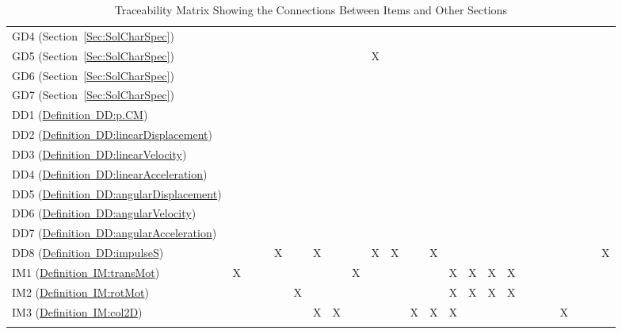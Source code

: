 \documentclass[12pt]{article}
\begin{document}
\begin{longtable}{l l l l l l l l l l l l l l l l l l l l l l l l}
\\
GD4 (Section~\ref{Sec:SolCharSpec}) &  &  &  &  &  &  &  &  &  &  &  &  &  &  &  &  &  &  &  &  &  &  & 
\\
GD5 (Section~\ref{Sec:SolCharSpec}) &  &  &  &  &  &  &  &  & X &  &  &  &  &  &  &  &  &  &  &  &  &  & 
\\
GD6 (Section~\ref{Sec:SolCharSpec}) &  &  &  &  &  &  &  &  &  &  &  &  &  &  &  &  &  &  &  &  &  &  & 
\\
GD7 (Section~\ref{Sec:SolCharSpec}) &  &  &  &  &  &  &  &  &  &  &  &  &  &  &  &  &  &  &  &  &  &  & 
\\
DD1 (\hyperref[DD:p.CM]{Definition~DD:p.CM}) &  &  &  &  &  &  &  &  &  &  &  &  &  &  &  &  &  &  &  &  &  &  & 
\\
DD2 (\hyperref[DD:linearDisplacement]{Definition~DD:linearDisplacement}) &  &  &  &  &  &  &  &  &  &  &  &  &  &  &  &  &  &  &  &  &  &  & 
\\
DD3 (\hyperref[DD:linearVelocity]{Definition~DD:linearVelocity}) &  &  &  &  &  &  &  &  &  &  &  &  &  &  &  &  &  &  &  &  &  &  & 
\\
DD4 (\hyperref[DD:linearAcceleration]{Definition~DD:linearAcceleration}) &  &  &  &  &  &  &  &  &  &  &  &  &  &  &  &  &  &  &  &  &  &  & 
\\
DD5 (\hyperref[DD:angularDisplacement]{Definition~DD:angularDisplacement}) &  &  &  &  &  &  &  &  &  &  &  &  &  &  &  &  &  &  &  &  &  &  & 
\\
DD6 (\hyperref[DD:angularVelocity]{Definition~DD:angularVelocity}) &  &  &  &  &  &  &  &  &  &  &  &  &  &  &  &  &  &  &  &  &  &  & 
\\
DD7 (\hyperref[DD:angularAcceleration]{Definition~DD:angularAcceleration}) &  &  &  &  &  &  &  &  &  &  &  &  &  &  &  &  &  &  &  &  &  &  & 
\\
DD8 (\hyperref[DD:impulseS]{Definition~DD:impulseS}) &  &  &  & X &  & X &  &  & X & X &  & X &  &  &  &  &  &  &  &  &  &  & X
\\
IM1 (\hyperref[IM:transMot]{Definition~IM:transMot}) & X &  &  &  &  &  &  & X &  &  &  &  & X & X & X & X &  &  &  &  &  &  & 
\\
IM2 (\hyperref[IM:rotMot]{Definition~IM:rotMot}) &  &  &  &  & X &  &  &  &  &  &  &  & X & X & X & X &  &  &  &  &  &  & 
\\
IM3 (\hyperref[IM:col2D]{Definition~IM:col2D}) &  &  &  &  &  & X & X &  &  &  & X & X & X &  &  &  &  &  &  & X &  &  & 
\\
\bottomrule
\caption{Traceability Matrix Showing the Connections Between Items and Other Sections}
\label{Table:TraceyItemsSecs}
\end{longtable}
\end{document}
